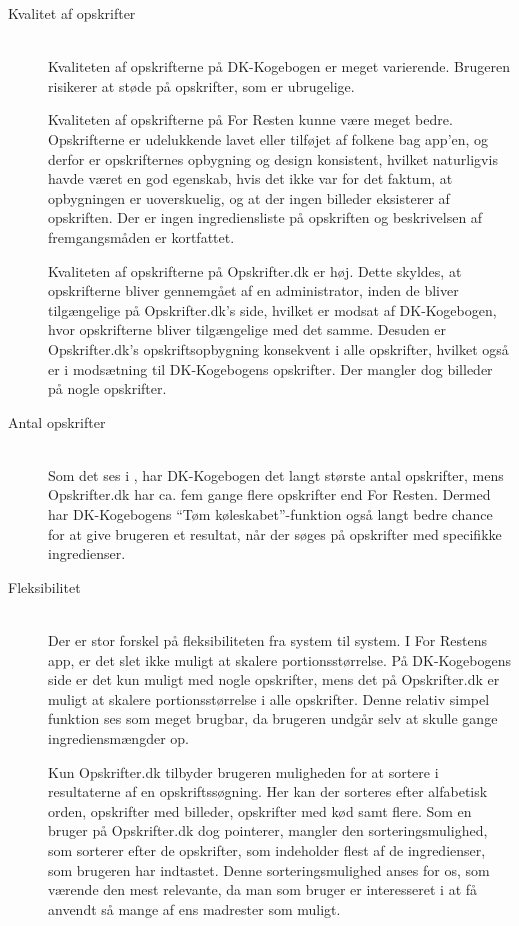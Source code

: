 \begin{description}
\item[Kvalitet af opskrifter] \hfill \\
Kvaliteten af opskrifterne på DK-Kogebogen er meget varierende. Brugeren risikerer at støde på opskrifter, som er ubrugelige. 

Kvaliteten af opskrifterne på For Resten kunne være meget bedre. Opskrifterne er udelukkende lavet eller tilføjet af folkene bag app’en, og derfor er opskrifternes opbygning og design konsistent, hvilket naturligvis havde været en god egenskab, hvis det ikke var for det faktum, at opbygningen er uoverskuelig, og at der ingen billeder eksisterer af opskriften. Der er ingen ingrediensliste på opskriften og beskrivelsen af fremgangsmåden er kortfattet. 

Kvaliteten af opskrifterne på Opskrifter.dk er høj. Dette skyldes, at opskrifterne bliver gennemgået af en administrator, inden de bliver tilgængelige på Opskrifter.dk’s side, hvilket er modsat af DK-Kogebogen, hvor opskrifterne bliver tilgængelige med det samme. Desuden er Opskrifter.dk’s opskriftsopbygning konsekvent i alle opskrifter, hvilket også er i modsætning til DK-Kogebogens opskrifter. Der mangler dog billeder på nogle opskrifter.

\item[Antal opskrifter] \hfill \\
Som det ses i , har DK-Kogebogen det langt største antal opskrifter, mens Opskrifter.dk har ca. fem gange flere opskrifter end For Resten. Dermed har DK-Kogebogens ``Tøm køleskabet''-funktion også langt bedre chance for at give brugeren et resultat, når der søges på opskrifter med specifikke ingredienser.

\item[Fleksibilitet] \hfill \\
Der er stor forskel på fleksibiliteten fra system til system. I For Restens app, er det slet ikke muligt at skalere portionsstørrelse. På DK-Kogebogens side er det kun muligt med nogle opskrifter, mens det på Opskrifter.dk er muligt at skalere portionsstørrelse i alle opskrifter. Denne relativ simpel funktion ses som meget brugbar, da brugeren undgår selv at skulle gange ingrediensmængder op.

Kun Opskrifter.dk tilbyder brugeren muligheden for at sortere i resultaterne af en opskriftssøgning. Her kan der sorteres efter alfabetisk orden, opskrifter med billeder, opskrifter med kød samt flere. Som en bruger på Opskrifter.dk dog pointerer, mangler den sorteringsmulighed, som sorterer efter de opskrifter, som indeholder flest af de ingredienser, som brugeren har indtastet. Denne sorteringsmulighed anses for os, som værende den mest relevante, da man som bruger er interesseret i at få anvendt så mange af ens madrester som muligt.


\end{description}
